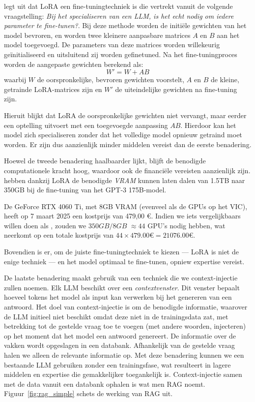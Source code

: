 \textcite{Hu2024} legt uit dat \acrshort{LoRA} een fine-tuningtechniek is die vertrekt vanuit de volgende vraagstelling: \emph{Bij het specialiseren van een \acrshort{LLM}, is het echt nodig om iedere parameter te fine-tunen?}. Bij deze methode worden de initiële gewichten van het model bevroren, en worden twee kleinere aanpasbare matrices $A$ en $B$ aan het model toegevoegd. De parameters van deze matrices worden willekeurig geïnitialiseerd en uitsluitend zij worden gefinetuned. Na het fine-tuningproces worden de aangepaste gewichten berekend als: \[W' = W + AB\] waarbij $W$ de oorspronkelijke, bevroren gewichten voorstelt, $A$ en $B$ de kleine, getrainde LoRA-matrices zijn en $W'$ de uiteindelijke gewichten na fine-tuning zijn. 

Hieruit blijkt dat \acrshort{LoRA} de oorspronkelijke gewichten niet vervangt, maar eerder een optelling uitvoert met een toegevoegde aanpassing $AB$. Hierdoor kan het model zich specialiseren zonder dat het volledige model opnieuw getraind moet worden. Er zijn dus aanzienlijk minder middelen vereist dan de eerste benadering.

Hoewel de tweede benadering haalbaarder lijkt, blijft de benodigde computationele kracht hoog, waardoor ook de financiële vereisten aanzienlijk zijn. \textcite{Hu2021} hebben dankzij \acrshort{LoRA} de benodigde \emph{VRAM} kunnen laten dalen van 1.5TB naar 350GB bij de fine-tuning van het GPT-3 175B-model.

De GeForce RTX 4060 Ti, met 8GB VRAM (evenveel als de GPUs op het VIC), heeft op 7 maart 2025 een kostprijs van 479,00 €. Indien we iets vergelijkbaars willen doen als \textcite{Hu2021}, zouden we $350GB / 8GB$ $\approx 44$ GPU's nodig hebben, wat neerkomt op een totale kostprijs van $44 \times 479.00 € = 21 076.00 €$.

Bovendien is er, om de juiste fine-tuningtechniek te kiezen --- LoRA is niet de enige techniek --- en het model optimaal te fine-tunen, opniew expertise vereist.

De laatste benadering maakt gebruik van een techniek die we context-injectie zullen noemen. Elk \acrshort{LLM} beschikt over een \emph{contextvenster}. Dit venster bepaalt hoeveel tokens het model als input kan verwerken bij het genereren van een antwoord. Het doel van context-injectie is om de benodigde informatie, waarover de \acrshort{LLM} initieel niet beschikt omdat deze niet in de trainingsdata zat, met betrekking tot de gestelde vraag toe te voegen (met andere woorden, injecteren) op het moment dat het model een antwoord genereert. De informatie over de vakken wordt opgeslagen in een databank. Afhankelijk van de gestelde vraag halen we alleen de relevante informatie op. Met deze benadering kunnen we een bestaande LLM gebruiken zonder een trainingsfase, wat resulteert in lagere middelen en expertise die gemakkelijker toegankelijk is. Context-injectie samen met de data vanuit een databank ophalen is wat men \acrfull{RAG} noemt. Figuur~\ref{fig:rag_simple} schets de werking van \acrshort{RAG} uit. 

